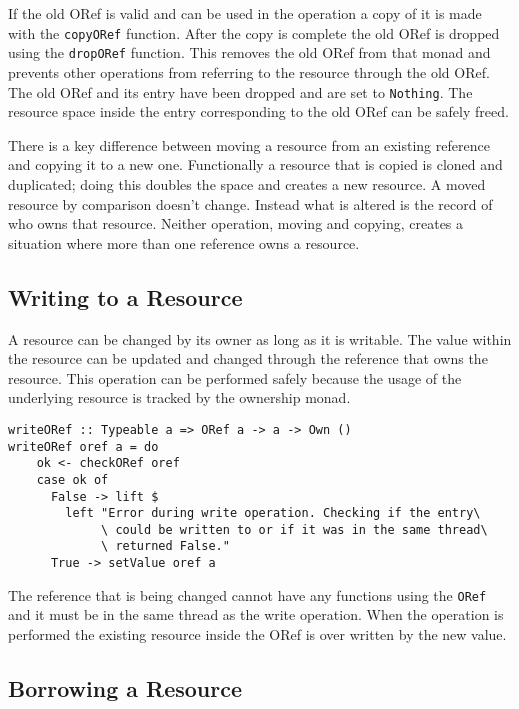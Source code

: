\documentclass[onehalf,11pt]{beavtex}
\begin{document}
If the old ORef is valid and can be used in the operation a copy of it is made
with the \texttt{copyORef} function.  After the copy is complete the old ORef
is dropped using the \texttt{dropORef} function. This removes the old ORef from
that monad and prevents other operations from referring to the resource through
the old ORef.
The old ORef and its entry have been dropped and are set to \texttt{Nothing}.
The resource space inside the entry corresponding to the old ORef can be safely
freed.

There is a key difference between moving a resource from an existing reference
and copying it to a new one.  Functionally a resource that is copied is cloned
and duplicated; doing this doubles the space and creates a new resource.
A moved resource by comparison doesn't change.  Instead what is altered is the
record of who owns that resource.  Neither operation, moving and copying,
creates a situation where more than one reference owns a resource.

\subsection{Writing to a Resource}

A resource can be changed by its owner as long as it is writable.
The value within the resource can be updated and changed through the reference
that owns the resource. This operation can be performed safely because the usage
of the underlying resource is tracked by the ownership monad.

\begin{verbatim}
writeORef :: Typeable a => ORef a -> a -> Own ()
writeORef oref a = do
    ok <- checkORef oref
    case ok of
      False -> lift $
        left "Error during write operation. Checking if the entry\
             \ could be written to or if it was in the same thread\
             \ returned False."
      True -> setValue oref a
\end{verbatim}

The reference that is being changed cannot have any functions using the
\texttt{ORef} and it must be in the same thread as the write operation.
When the operation is performed the existing resource inside the ORef is over
written by the new value.

\subsection{Borrowing a Resource}
\end{document}
